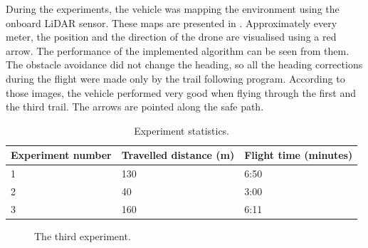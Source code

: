 During the experiments, the vehicle was mapping the environment using the onboard \acs{LiDAR} sensor. These maps are presented in . Approximately every meter, the position and the direction of the drone are visualised using a red arrow. The performance of the implemented algorithm can be seen from them. The obstacle avoidance did not change the heading, so all the heading corrections during the flight were made only by the trail following program. According to those images, the vehicle performed very good when flying through the first and the third trail. The arrows are pointed along the safe path.

\begin{table}[]
\centering
\begin{tabular}{|l|l|l|}
\hline
Experiment number & Travelled distance (m) & Flight time (minutes) \\ \hline
1                 & 130                    & 6:50                  \\ \hline
2                 & 40                     & 3:00                  \\ \hline
3                 & 160                    & 6:11                  \\ \hline
\end{tabular}
\caption{Experiment statistics.}
\end{table}

\begin{figure}[!h]

  \centering

  \centering	
  


  \caption{The third experiment.}
  \label{fig:third_trail_photos}
\end{figure}


